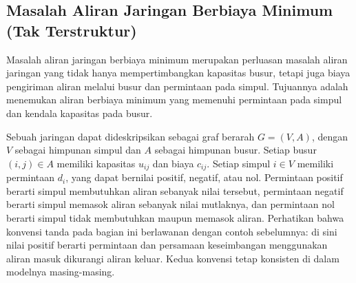 \subsection{Masalah Aliran Jaringan Berbiaya Minimum (Tak Terstruktur)}
Masalah aliran jaringan berbiaya minimum merupakan perluasan masalah aliran jaringan yang tidak hanya mempertimbangkan kapasitas busur, tetapi juga biaya pengiriman aliran melalui busur dan permintaan pada simpul. Tujuannya adalah menemukan aliran berbiaya minimum yang memenuhi permintaan pada simpul dan kendala kapasitas pada busur.

Sebuah jaringan dapat dideskripsikan sebagai graf berarah \( G = (V, A) \), dengan \( V \) sebagai himpunan simpul dan \( A \) sebagai himpunan busur. Setiap busur \( (i, j) \in A \) memiliki kapasitas \( u_{ij} \) dan biaya \( c_{ij} \). Setiap simpul \( i \in V\) memiliki permintaan \( d_i \), yang dapat bernilai positif, negatif, atau nol. Permintaan positif berarti simpul membutuhkan aliran sebanyak nilai tersebut, permintaan negatif berarti simpul memasok aliran sebanyak nilai mutlaknya, dan permintaan nol berarti simpul tidak membutuhkan maupun memasok aliran. Perhatikan bahwa konvensi tanda pada bagian ini berlawanan dengan contoh sebelumnya: di sini nilai positif berarti permintaan dan persamaan keseimbangan menggunakan aliran masuk dikurangi aliran keluar. Kedua konvensi tetap konsisten di dalam modelnya masing-masing.

